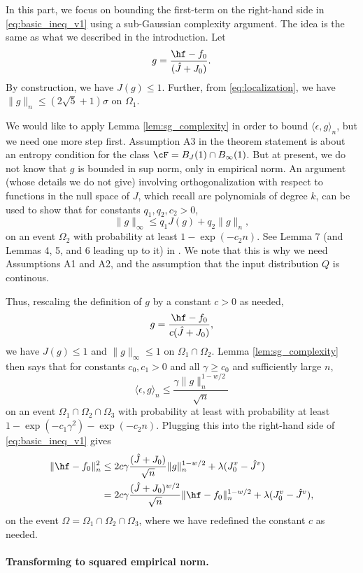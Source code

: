 \documentclass{article}
\begin{document}
In this part, we focus on bounding the first-term on the right-hand side in 
\eqref{eq:basic_ineq_v1} using a sub-Gaussian complexity argument. The idea is
the same as what we described in the introduction. Let
\[
g = \frac{\hf-f_0}{({\hat J} + J_0)}.
\]
By construction, we have $J(g) \leq 1$. Further, from \eqref{eq:localization},
we have $\|g\|_n \leq (2{\sqrt 5} + 1) \sigma$ on $\Omega_1$.  

We would like to apply Lemma \ref{lem:sg_complexity} in order to bound $\langle 
\epsilon, g \rangle_n$, but we need one more step first. Assumption A3 in the
theorem statement is about an entropy condition for the class $\cF = B_J(1) \cap
B_\infty(1)$. But at present, we do not know that $g$ is bounded in sup norm,
only in empirical norm. An argument (whose details we do not give) involving
orthogonalization with respect to functions in the null space of $J$, which
recall are polynomials of degree $k$, can be used to show that for constants
$q_1,q_2,c_2>0$, 
\[
\|g\|_\infty \leq q_1 J(g) + q_2 \|g\|_n,
\]
on an event $\Omega_2$ with probability at least $1-\exp(-c_2 n)$. See Lemma 7
(and Lemmas 4, 5, and 6 leading up to it) in \citet{sadhanala2019additive}. We
note that this is why we need Assumptions A1 and A2, and the assumption that the 
input distribution $Q$ is continous.   

Thus, rescaling the definition of $g$ by a constant $c>0$ as needed, 
\[
g = \frac{\hf-f_0}{c({\hat J} + J_0)},
\]
we have $J(g) \leq 1$ and $\|g\|_\infty \leq 1$ on $\Omega_1 \cap
\Omega_2$. Lemma \ref{lem:sg_complexity} then says that for constants
$c_0,c_1>0$ and all $\gamma \geq c_0$ and sufficiently large $n$,     
\[
\langle \epsilon, g \rangle_n \leq \frac{\gamma \|g\|_n^{1-w/2}}{\sqrt n} 
\]
on an event $\Omega_1 \cap \Omega_2 \cap \Omega_3$ with probability at least 
with probability at least $1 - \exp(-c_1\gamma^2) - \exp(-c_2n)$. Plugging this 
into the right-hand side of \eqref{eq:basic_ineq_v1} gives 
\begin{align}
\nonumber
\|\hf - f_0\|_n^2 &\leq 2c \gamma \frac{({\hat J} + J_0)}{\sqrt n}
 \|g\|_n^{1-w/2} + \lambda (J_0^v - {\hat J}^v) \\ 
\label{eq:basic_ineq_v2}
&= 2c \gamma \frac{({\hat J} + J_0)^{w/2}}{\sqrt n} \|\hf-f_0\|_n^{1-w/2} +
  \lambda (J_0^v - {\hat J}^v), 
\end{align} 
on the event $\Omega = \Omega_1 \cap \Omega_2 \cap \Omega_3$, where we have
redefined the constant $c$ as needed.

\paragraph{Transforming to squared empirical norm.} 
\end{document}
